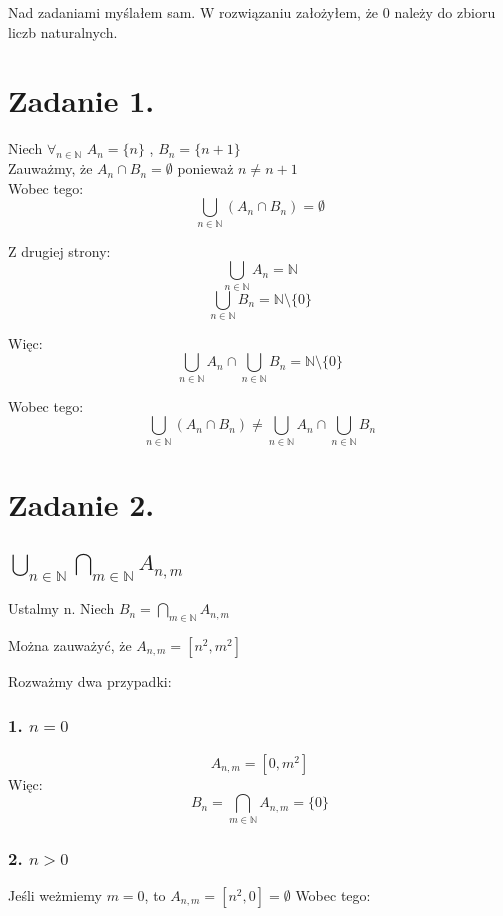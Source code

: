 \documentclass{article}
\begin{document}
\newcommand{\imp}{\Rightarrow}
\newcommand{\lub}{\vee}
\newcommand{\roz}{\setminus}
\newcommand{\zbp}{\emptyset}
\newcommand{\zbpot}{\mathcal{P}}
\newcommand{\troj}{\bigtriangleup}
\newcommand{\nat}{\mathbb{N}}
\newcommand{\rze}{\mathbb{R}}
\newcommand{\wegde}{\wedge}
\newcommand{\eps}{\varepsilon}
\maketitle
Nad zadaniami myślałem sam. W rozwiązaniu założyłem, że 0 należy do zbioru liczb naturalnych.
\section*{Zadanie 1.}
Niech $\forall_{ n \in \nat }$ $A_n = \{n\}$ , $B_n = \{n+1\}$
\\ Zauważmy, że $A_n \cap B_n = \zbp$  ponieważ $n\neq n+1$
\\Wobec tego: 
\[\bigcup_{n \in \nat} ( A_n \cap B_n ) = \zbp \]

Z drugiej strony: 
\[ \bigcup_{n \in \nat } A_n = \nat  \]
\[ \bigcup_{n \in \nat } B_n = \nat \roz \{0\}  \]

Więc:
\[ \bigcup_{n \in \nat } A_n \cap \bigcup_{n \in \nat } B_n = \nat \roz \{0\}  \]

Wobec tego: 
\[ \bigcup_{n \in \nat} ( A_n \cap B_n ) \neq \bigcup_{n \in \nat } A_n \cap \bigcup_{n \in \nat } B_n   \]

\section*{Zadanie 2.}


\subsection*{$\bigcup_{n \in \nat} \bigcap_{m \in \nat} A_{n,m}$}  

Ustalmy n. Niech $B_n = \bigcap_{m \in \nat} A_{n,m}$

Można zauważyć, że $A_{n,m} = [n^2,m^2]$

Rozważmy dwa przypadki:
\subsubsection*{1. $n=0$}
\[A_{n,m} = [0,m^2]\]
Więc: \[B_n = \bigcap_{m \in \nat} A_{n,m} = \{0\}\]

\subsubsection*{2. $n>0$}
Jeśli weżmiemy $m = 0$, to $A_{n,m}= [n^2,0] = \zbp$
Wobec tego:
\end{document}
